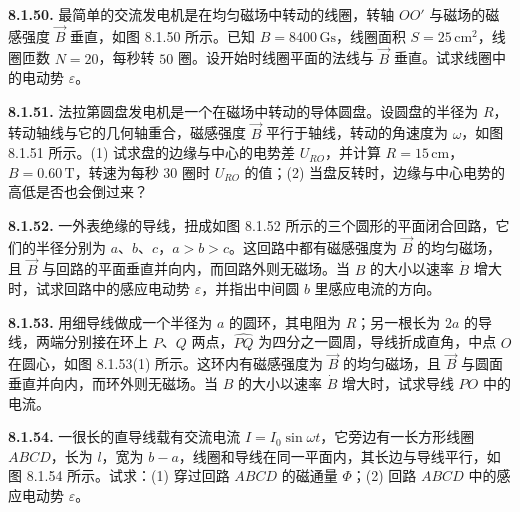 \textbf{8.1.50.} 最简单的交流发电机是在均匀磁场中转动的线圈，转轴 $OO'$ 与磁场的磁感强度 $\vec{B}$ 垂直，如图 8.1.50 所示。已知 $B = 8400\,\mathrm{Gs}$，线圈面积 $S = 25\,\mathrm{cm}^{2}$，线圈匝数 $N = 20$，每秒转 $50$ 圈。设开始时线圈平面的法线与 $\vec{B}$ 垂直。试求线圈中的电动势 $\varepsilon$。

\begin{center}
\end{center}

\vfill
\newpage

\textbf{8.1.51.} 法拉第圆盘发电机是一个在磁场中转动的导体圆盘。设圆盘的半径为 $R$，转动轴线与它的几何轴重合，磁感强度 $\vec{B}$ 平行于轴线，转动的角速度为 $\omega$，如图 8.1.51 所示。(1) 试求盘的边缘与中心的电势差 $U_{RO}$，并计算 $R = 15\,\mathrm{cm}$，$B = 0.60\,\mathrm{T}$，转速为每秒 $30$ 圈时 $U_{RO}$ 的值；(2) 当盘反转时，边缘与中心电势的高低是否也会倒过来？

\begin{center}
\end{center}

\vfill
\newpage

\textbf{8.1.52.} 一外表绝缘的导线，扭成如图 8.1.52 所示的三个圆形的平面闭合回路，它们的半径分别为 $a$、$b$、$c$，$a > b > c$。这回路中都有磁感强度为 $\vec{B}$ 的均匀磁场，且 $\vec{B}$ 与回路的平面垂直并向内，而回路外则无磁场。当 $B$ 的大小以速率 $\dot{B}$ 增大时，试求回路中的感应电动势 $\varepsilon$，并指出中间圆 $b$ 里感应电流的方向。

\begin{center}
\end{center}

\vfill
\newpage

\textbf{8.1.53.} 用细导线做成一个半径为 $a$ 的圆环，其电阻为 $R$；另一根长为 $2a$ 的导线，两端分别接在环上 $P$、$Q$ 两点，$\widehat{PQ}$ 为四分之一圆周，导线折成直角，中点 $O$ 在圆心，如图 8.1.53(1) 所示。这环内有磁感强度为 $\vec{B}$ 的均匀磁场，且 $\vec{B}$ 与圆面垂直并向内，而环外则无磁场。当 $B$ 的大小以速率 $\dot{B}$ 增大时，试求导线 $PO$ 中的电流。

\begin{center}
\end{center}

\vfill
\newpage

\textbf{8.1.54.} 一很长的直导线载有交流电流 $I = I_0 \sin \omega t$，它旁边有一长方形线圈 $ABCD$，长为 $l$，宽为 $b - a$，线圈和导线在同一平面内，其长边与导线平行，如图 8.1.54 所示。试求：(1) 穿过回路 $ABCD$ 的磁通量 $\Phi$；(2) 回路 $ABCD$ 中的感应电动势 $\varepsilon$。

